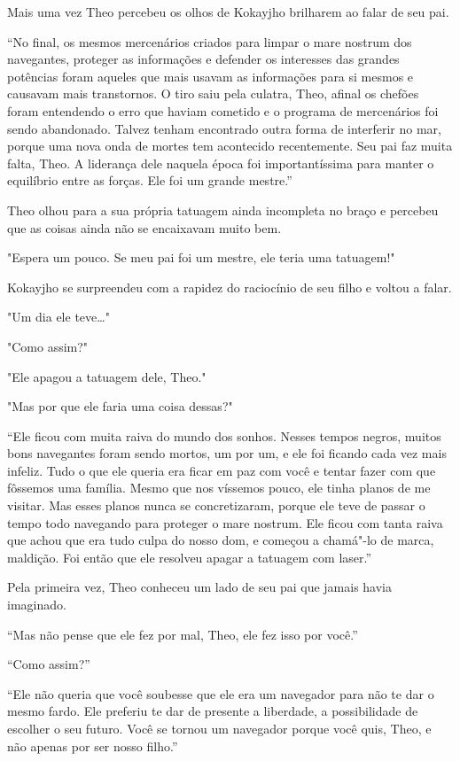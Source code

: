 Mais uma vez Theo percebeu os olhos de Kokayjho brilharem ao falar de
seu pai.

``No final, os mesmos mercenários criados para limpar o mare
nostrum dos navegantes, proteger as informações e defender os interesses
das grandes potências foram aqueles que mais usavam as informações para
si mesmos e causavam mais transtornos. O tiro saiu pela culatra, Theo,
afinal os chefões foram entendendo o erro que haviam cometido e o
programa de mercenários foi sendo abandonado. Talvez tenham encontrado
outra forma de interferir no mar, porque uma nova onda de mortes tem
acontecido recentemente. Seu pai faz muita falta, Theo. A liderança dele
naquela época foi importantíssima para manter o equilíbrio entre as
forças. Ele foi um grande mestre.''

Theo olhou para a sua própria tatuagem ainda incompleta no braço e
percebeu que as coisas ainda não se encaixavam muito bem.

"Espera um pouco. Se meu pai foi um mestre, ele teria uma tatuagem!"

Kokayjho se surpreendeu com a rapidez do raciocínio de seu filho e
voltou a falar.

"Um dia ele teve\ldots{}"

"Como assim?"

"Ele apagou a tatuagem dele, Theo."

"Mas por que ele faria uma coisa dessas?"

``Ele ficou com muita raiva do mundo dos sonhos. Nesses tempos negros,
muitos bons navegantes foram sendo mortos, um por um, e ele foi ficando
cada vez mais infeliz. Tudo o que ele queria era ficar em paz com você e
tentar fazer com que fôssemos uma família. Mesmo que nos víssemos pouco,
ele tinha planos de me visitar. Mas esses planos nunca se concretizaram,
porque ele teve de passar o tempo todo navegando para proteger o
mare nostrum. Ele ficou com tanta raiva que achou que era tudo culpa do
nosso dom, e começou a chamá"-lo de marca, maldição. Foi então que ele
resolveu apagar a tatuagem com laser.''

Pela primeira vez, Theo conheceu um lado de seu pai que jamais havia
imaginado.

``Mas não pense que ele fez por mal, Theo, ele fez isso por você.''

``Como assim?''

``Ele não queria que você soubesse que ele era um navegador para não te
dar o mesmo fardo. Ele preferiu te dar de presente a liberdade, a
possibilidade de escolher o seu futuro. Você se tornou um navegador
porque você quis, Theo, e não apenas por ser nosso filho.''


